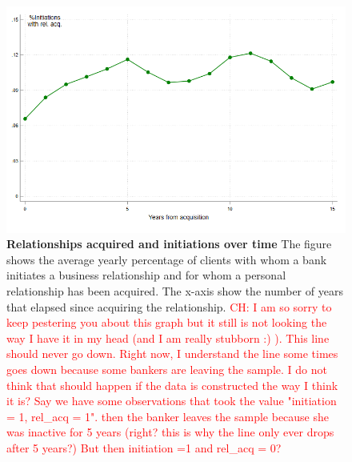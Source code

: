 \begin{figure}[H]
	\caption{\textbf{Relationships acquired and initiations over time} \newline
		The figure shows the average yearly percentage of clients with whom a bank initiates a business relationship and for whom a personal relationship has been acquired. The x-axis show the number of years that elapsed since acquiring the relationship.
\textcolor{red}{CH: I am so sorry to keep pestering you about this graph but it still is not looking the way I have it in my head (and I am really stubborn :) ). This line should never go down. Right now, I understand the line some times goes down because some bankers are leaving the sample. I do not think that should happen if the data is constructed the way I think it is? Say we have some observations that took the value "initiation = 1, rel\_acq = 1". then the banker leaves the sample because she was inactive for 5 years (right? this is why the line only ever drops after 5 years?) But then initiation =1 and rel\_acq = 0? }	
}
	\label{fig:no_bankers}
	\centering
	\includegraphics[angle=0,  scale=0.6]{figures/intiation_over_time.png}
\end{figure}



%
%
%


